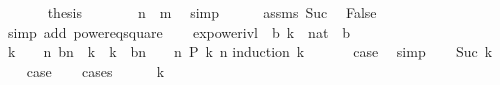 \begin{isabellebody}
\ \ \ \ \isamarkupfalse%
\ {\isachardoublequoteopen}{\isasymnot}\ {\isacharquery}{\kern0pt}thesis{\isachardoublequoteclose}\isanewline
\ \ \ \ \isamarkupfalse%
\ \isamarkupfalse%
\ {\isachardoublequoteopen}n\ {\isacharless}{\kern0pt}\ m{\isachardoublequoteclose}\ \isamarkupfalse%
\ simp\isanewline
\ \ \ \ \isamarkupfalse%
\ assms\ Suc\ \isamarkupfalse%
\ False\isanewline
\ \ \ \ \ \ \isamarkupfalse%
\ {\isacharparenleft}{\kern0pt}simp\ add{\isacharcolon}{\kern0pt}\ power{}{\isacharunderscore}{\kern0pt}eq{\isacharunderscore}{\kern0pt}square{\isacharparenright}{\kern0pt}\isanewline
\ \ \isamarkupfalse%
\isanewline
{}\isamarkupfalse%
%
\endisatagproof
{\isafoldproof}%
%
\isadelimproof
\isanewline
%
\endisadelimproof
\isanewline
{}\isamarkupfalse%
\ ex{\isacharunderscore}{\kern0pt}power{\isacharunderscore}{\kern0pt}ivl{}{\isacharcolon}{\kern0pt}\ \ b\ k\ {\isacharcolon}{\kern0pt}{\isacharcolon}{\kern0pt}\ nat\ \ {\isachardoublequoteopen}b\ {\isasymge}\ {}{\isachardoublequoteclose}\isanewline
{}\ {\isachardoublequoteopen}k\ {\isasymge}\ {}\ {\isasymLongrightarrow}\ {\isasymexists}n{\isachardot}{\kern0pt}\ b{\isacharcircum}{\kern0pt}n\ {\isasymle}\ k\ {\isasymand}\ k\ {\isacharless}{\kern0pt}\ b{\isacharcircum}{\kern0pt}{\isacharparenleft}{\kern0pt}n{\isacharplus}{\kern0pt}{}{\isacharparenright}{\kern0pt}{\isachardoublequoteclose}\ {\isacharparenleft}{\kern0pt}\ {\isachardoublequoteopen}{\isacharunderscore}{\kern0pt}\ {\isasymLongrightarrow}\ {\isasymexists}n{\isachardot}{\kern0pt}\ {\isacharquery}{\kern0pt}P\ k\ n{\isachardoublequoteclose}{\isacharparenright}{\kern0pt}\isanewline
%
\isadelimproof
%
\endisadelimproof
%
\isatagproof
{}\isamarkupfalse%
{\isacharparenleft}{\kern0pt}induction\ k{\isacharparenright}{\kern0pt}\isanewline
\ \ \isamarkupfalse%
\ {}\ \isamarkupfalse%
\ {\isacharquery}{\kern0pt}case\ \isamarkupfalse%
\ simp\isanewline
{}\isamarkupfalse%
\isanewline
\ \ \isamarkupfalse%
\ {\isacharparenleft}{\kern0pt}Suc\ k{\isacharparenright}{\kern0pt}\isanewline
\ \ \isamarkupfalse%
\ {\isacharquery}{\kern0pt}case\isanewline
\ \ \isamarkupfalse%
\ cases\isanewline
\ \ \ \ \isamarkupfalse%
\ {\isachardoublequoteopen}k{\isacharequal}{\kern0pt}{}{\isachardoublequoteclose}\isanewline

\end{isabellebody}
